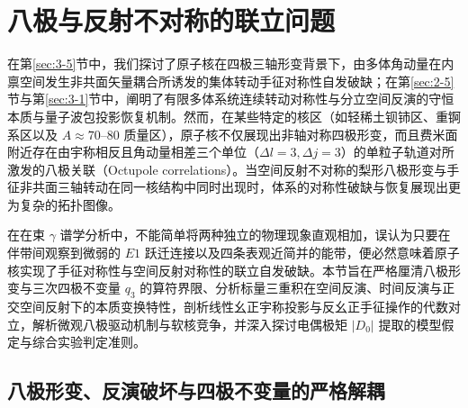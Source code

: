 \section{八极与反射不对称的联立问题}\label{sec:3-7}

在第\ref{sec:3-5}节中，我们探讨了原子核在四极三轴形变背景下，由多体角动量在内禀空间发生非共面矢量耦合所诱发的集体转动手征对称性自发破缺；在第\ref{sec:2-5}节与第\ref{sec:3-1}节中，阐明了有限多体系统连续转动对称性与分立空间反演的守恒本质与量子波包投影恢复机制。然而，在某些特定的核区（如轻稀土钡铈区、重锕系区以及 $A \approx 70$--$80$ 质量区），原子核不仅展现出非轴对称四极形变，而且费米面附近存在由宇称相反且角动量相差三个单位（$\Delta l = 3, \Delta j = 3$）的单粒子轨道对所激发的八极关联（Octupole correlations）。当空间反射不对称的梨形八极形变与手征非共面三轴转动在同一核结构中同时出现时，体系的对称性破缺与恢复展现出更为复杂的拓扑图像。

在在束 $\gamma$ 谱学分析中，不能简单将两种独立的物理现象直观相加，误认为只要在伴带间观察到微弱的 $E1$ 跃迁连接以及四条表观近简并的能带，便必然意味着原子核实现了手征对称性与空间反射对称性的联立自发破缺。本节旨在严格厘清八极形变与三次四极不变量 $q_3$ 的算符界限、分析标量三重积在空间反演、时间反演与正交空间反射下的本质变换特性，剖析线性幺正宇称投影与反幺正手征操作的代数对立，解析微观八极驱动机制与软核竞争，并深入探讨电偶极矩 $|D_0|$ 提取的模型假定与综合实验判定准则。

\subsection{八极形变、反演破坏与四极不变量的严格解耦}\label{sec:3-7-1}

